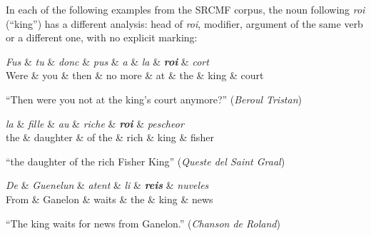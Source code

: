 In each of the following examples from the SRCMF corpus, the noun following \emph{roi} (\enquote{king}) has a different analysis: head of \emph{roi}, modifier, argument of the same verb or a different one, with no explicit marking:

\begin{center}
    \begin{dependency}[theme=simple]
        \begin{deptext}[row 2/.style={font=\small}]
            \textit{Fus} \& \textit{tu} \& \textit{donc} \& \textit{pus} \& \textit{a} \& \textit{la} \& \textbf{\textit{roi}} \& \textit{cort} \\
            Were \& you \& then \& no more \& at \& the \& king \& court \\
        \end{deptext}
    \end{dependency}

    \raggedright
    \enquote{Then were you not at the king's court anymore?} (\emph{Beroul Tristan})
\end{center}

\begin{center}
    \begin{dependency}[theme=simple]
        \begin{deptext}[row 2/.style={font=\small}]
            \textit{la} \& \textit{fille} \& \textit{au} \& \textit{riche} \& \textbf{\textit{roi}} \& \textit{pescheor} \\
            the \& daughter \& of the \& rich \& king \& fisher \\
        \end{deptext}
    \end{dependency}

    \raggedright
    \enquote{the daughter of the rich Fisher King} (\emph{Queste del Saint Graal})
\end{center}

\begin{center}
    \begin{dependency}[theme=simple]
        \begin{deptext}[row 2/.style={font=\small}]
            \textit{De} \& \textit{Guenelun} \& \textit{atent} \& \textit{li} \& \textbf{\textit{reis}} \& \textit{nuveles} \\
            From \& Ganelon \& waits \& the \& king \& news \\
        \end{deptext}
    \end{dependency}

    \raggedright
    \enquote{The king waits for news from Ganelon.} (\emph{Chanson de Roland})
\end{center}

